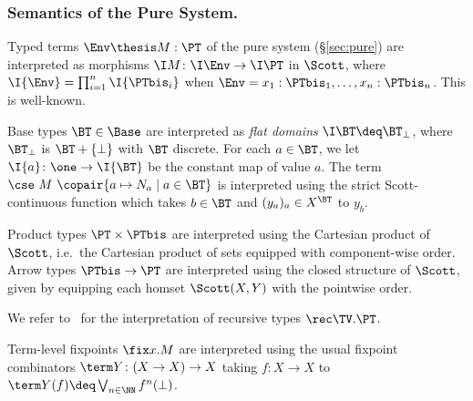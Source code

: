 \subsubsection{Semantics of the Pure System.}
\label{sec:sem:pure}
Typed terms $\Env \thesis M : \PT$ of the pure system (\S\ref{sec:pure})
are interpreted as morphisms $\I M \colon \I\Env \to \I\PT$ in $\Scott$,
where $\I{\Env} = \prod_{i=1}^n\I{\PTbis_i}$ when
$\Env = x_1:\PTbis_1,\dots,x_n:\PTbis_n$.
This is well-known.


Base types $\BT \in \Base$ are interpreted as \emph{flat domains}
$\I\BT \deq \BT_\bot$,
where
$\BT_\bot$ is $\BT+\{\bot\}$ with $\BT$ discrete.
For each $a \in \BT$, we let $\I{a} \colon \one \to \I{\BT}$
be the constant map of value $a$.
The term %
$\cse\ M\ \copair{a \mapsto N_a \mid a \in \BT}$
is interpreted using the strict Scott-continuous function
which takes $b \in \BT$ and $(y_a)_a \in X^{\BT}$ to $y_b$.


\begin{full}
Product types $\PT \times \PTbis$ are interpreted using
the Cartesian product of $\Scott$, i.e.\ the Cartesian product
of sets equipped with component-wise order.
%
Arrow types $\PTbis \to \PT$ are interpreted using the
closed structure of $\Scott$,
given by equipping each homset $\Scott(X,Y)$ with the pointwise order.
\end{full}

We refer to~\cite{ac98book,aj95chapter,streicher06book}
for the interpretation of recursive types $\rec\TV.\PT$.%


Term-level fixpoints $\fix x.M$ are interpreted
using the usual fixpoint combinators $\term Y \colon (X \to X) \to X$
taking $f \colon X \to X$ to $\term Y(f) \deq \bigvee_{n \in \NN} f^n(\bot)$.

